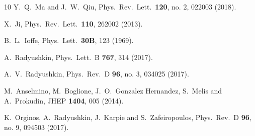 \begin{thebibliography}{10}
  Y.~Q.~Ma and J.~W.~Qiu,
  Phys.\ Rev.\ Lett.\  {\bf 120}, no. 2, 022003 (2018).


  X.~Ji,
  Phys.\ Rev.\ Lett.\  {\bf 110}, 262002 (2013).


  B.~L.~Ioffe,
  Phys.\ Lett.\  {\bf 30B}, 123 (1969).


  A.~Radyushkin,
  Phys.\ Lett.\ B {\bf 767}, 314 (2017).


  A.~V.~Radyushkin,
  Phys.\ Rev.\ D {\bf 96}, no. 3, 034025 (2017).


  M.~Anselmino, M.~Boglione, J.~O.~Gonzalez Hernandez, S.~Melis and A.~Prokudin,
  JHEP {\bf 1404}, 005 (2014).


  K.~Orginos, A.~Radyushkin, J.~Karpie and S.~Zafeiropoulos,
  Phys.\ Rev.\ D {\bf 96}, no. 9, 094503 (2017).



\end{thebibliography}
